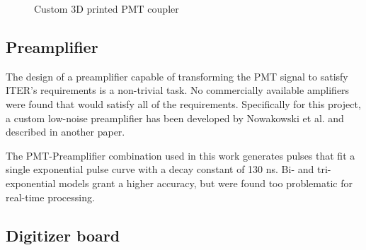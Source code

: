\begin{figure}[H]
  \centering
{}

  \centering
{}
  \caption{Custom 3D printed PMT coupler}
  \label{fig:real_3dprint} 
\end{figure}

\subsection{Preamplifier}

The design of a preamplifier capable of transforming the PMT signal
to satisfy ITER's requirements is a non-trivial task.
No commercially available amplifiers were found
that would satisfy all of the requirements.
Specifically for this project, a custom low-noise preamplifier 
has been developed by Nowakowski et al. and described in another 
paper. 
\cite{low_noise_amplifier_for_pmt}


The PMT-Preamplifier combination used in this work generates pulses that 
fit a single exponential pulse curve with a decay constant of 130 ns.
Bi- and tri-exponential models grant a higher accuracy, but
were found too problematic for real-time processing. 

\subsection{Digitizer board}

